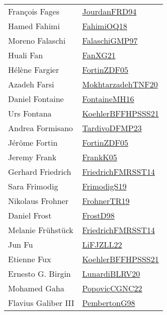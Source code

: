{\begin{longtable}{p{4cm}p{20cm}}
Fran{\c{c}}ois Fages & \href{papers/JourdanFRD94.pdf}{JourdanFRD94}\cite{JourdanFRD94} \\
Hamed Fahimi & \href{articles/FahimiOQ18.pdf}{FahimiOQ18}\cite{FahimiOQ18} \\
Moreno Falaschi & \href{articles/FalaschiGMP97.pdf}{FalaschiGMP97}\cite{FalaschiGMP97} \\
Huali Fan & \href{articles/FanXG21.pdf}{FanXG21}\cite{FanXG21} \\
H{\'{e}}l{\`{e}}ne Fargier & \href{papers/FortinZDF05.pdf}{FortinZDF05}\cite{FortinZDF05} \\
Azadeh Farsi & \href{articles/MokhtarzadehTNF20.pdf}{MokhtarzadehTNF20}\cite{MokhtarzadehTNF20} \\
Daniel Fontaine & \href{papers/FontaineMH16.pdf}{FontaineMH16}\cite{FontaineMH16} \\
Urs Fontana & \href{articles/KoehlerBFFHPSSS21.pdf}{KoehlerBFFHPSSS21}\cite{KoehlerBFFHPSSS21} \\
Andrea Formisano & \href{papers/TardivoDFMP23.pdf}{TardivoDFMP23}\cite{TardivoDFMP23} \\
J{\'{e}}r{\^{o}}me Fortin & \href{papers/FortinZDF05.pdf}{FortinZDF05}\cite{FortinZDF05} \\
Jeremy Frank & \href{papers/FrankK05.pdf}{FrankK05}\cite{FrankK05} \\
Gerhard Friedrich & \href{papers/FriedrichFMRSST14.pdf}{FriedrichFMRSST14}\cite{FriedrichFMRSST14} \\
Sara Frimodig & \href{papers/FrimodigS19.pdf}{FrimodigS19}\cite{FrimodigS19} \\
Nikolaus Frohner & \href{papers/FrohnerTR19.pdf}{FrohnerTR19}\cite{FrohnerTR19} \\
Daniel Frost & \href{papers/FrostD98.pdf}{FrostD98}\cite{FrostD98} \\
Melanie Fr{\"{u}}hst{\"{u}}ck & \href{papers/FriedrichFMRSST14.pdf}{FriedrichFMRSST14}\cite{FriedrichFMRSST14} \\
Jun Fu & \href{papers/LiFJZLL22.pdf}{LiFJZLL22}\cite{LiFJZLL22} \\
Etienne Fux & \href{articles/KoehlerBFFHPSSS21.pdf}{KoehlerBFFHPSSS21}\cite{KoehlerBFFHPSSS21} \\
Ernesto G. Birgin & \href{articles/LunardiBLRV20.pdf}{LunardiBLRV20}\cite{LunardiBLRV20} \\
Mohamed Gaha & \href{papers/PopovicCGNC22.pdf}{PopovicCGNC22}\cite{PopovicCGNC22} \\
Flavius Galiber III & \href{papers/PembertonG98.pdf}{PembertonG98}\cite{PembertonG98} \\

\end{longtable}}

